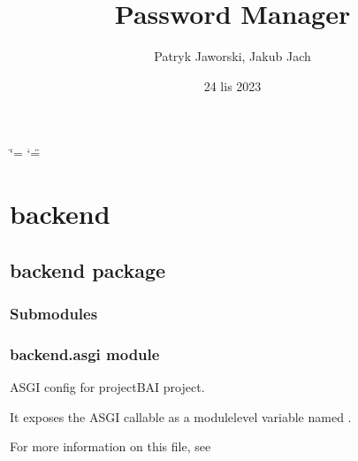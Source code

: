 \documentclass[letterpaper,10pt,polish]{sphinxmanual}
\title{Password Manager}
\date{24 lis 2023}
\author{Patryk Jaworski, Jakub Jach}
\begin{document}
\ifdefined\shorthandoff
  \ifnum\catcode`\=\string=\active\shorthandoff{=}\fi
  \ifnum\catcode`\"=\active{}\fi
\fi

\pagestyle{empty}
\sphinxmaketitle
\pagestyle{plain}
\sphinxtableofcontents
\pagestyle{normal}
\label{\detokenize{index::doc}}


\sphinxstepscope


\chapter{backend}
\label{\detokenize{modules:backend}}\label{\detokenize{modules::doc}}
\sphinxstepscope


\section{backend package}
\label{\detokenize{backend:backend-package}}\label{\detokenize{backend::doc}}

\subsection{Submodules}
\label{\detokenize{backend:submodules}}

\subsection{backend.asgi module}
\label{\detokenize{backend:module-backend.asgi}}\label{\detokenize{backend:backend-asgi-module}}
\sphinxAtStartPar
ASGI config for projectBAI project.

\sphinxAtStartPar
It exposes the ASGI callable as a module\sphinxhyphen{}level variable named .

\sphinxAtStartPar
For more information on this file, see
\end{document}

